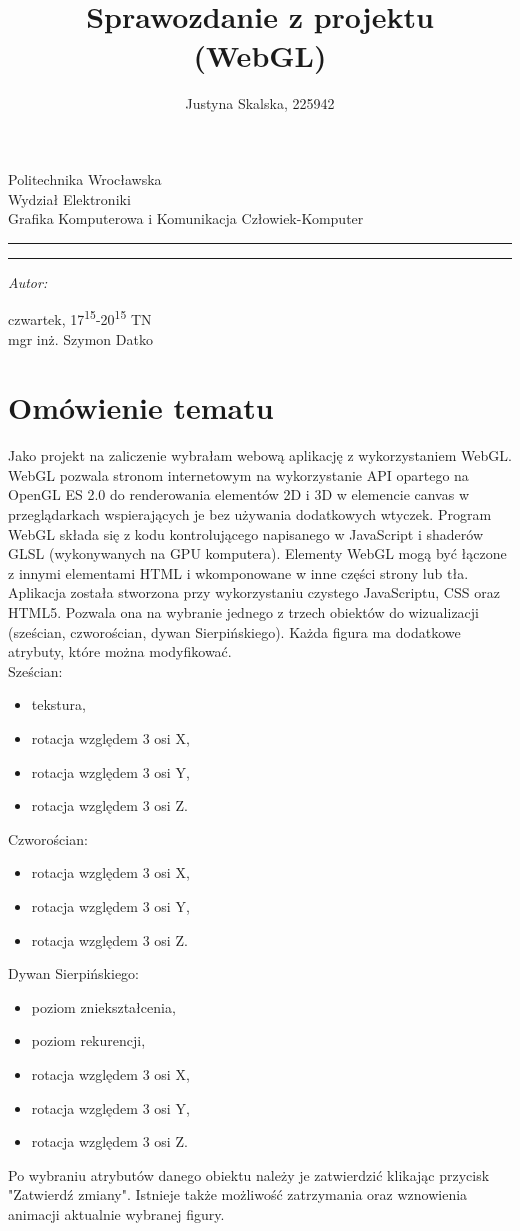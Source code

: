\documentclass[12pt,a4paper,titlepage]{article}
\author{Justyna Skalska, 225942}
\title{Sprawozdanie z projektu\\
(WebGL)}
\makeatletter
\newcommand{\linia}{\rule{\linewidth}{0.4mm}}
\renewcommand{\maketitle}{\begin{titlepage}
    \vspace*{1cm}
    \begin{center}\small
    Politechnika Wrocławska\\
    Wydział Elektroniki\\
    Grafika Komputerowa i Komunikacja Człowiek-Komputer
    \end{center}
    \vspace{3cm}
    \noindent\linia
    \begin{center}
      \LARGE \textsc{\@title}
         \end{center}
     \linia
    \vspace{0.5cm}
    \begin{flushright}
    \begin{minipage}{7cm}
    \textit{\small Autor:}\\
    \normalsize \textsc{\@author} \par
    \end{minipage}
    \vspace{5cm}

     {\small czwartek, 17\textsuperscript{15}-20\textsuperscript{15} TN}\\
        mgr inż. Szymon Datko
     \end{flushright}
    \vspace*{\stretch{6}}
    \begin{center}
    \@date
    \end{center}
  \end{titlepage}%
}
\makeatother
\begin{document}
\maketitle
\tableofcontents
\newpage

\section{Omówienie tematu}
Jako projekt na zaliczenie wybrałam webową aplikację z wykorzystaniem WebGL. WebGL pozwala stronom internetowym na wykorzystanie API opartego na OpenGL ES 2.0 do renderowania elementów 2D i 3D w elemencie canvas w przeglądarkach wspierających je bez używania dodatkowych wtyczek. Program WebGL składa się z kodu kontrolującego napisanego w JavaScript i shaderów GLSL (wykonywanych na GPU komputera). Elementy WebGL mogą być łączone z innymi elementami HTML i wkomponowane w inne części strony lub tła. \cite{mozilla} Aplikacja została stworzona przy wykorzystaniu czystego JavaScriptu, CSS oraz HTML5. Pozwala ona na wybranie jednego z trzech obiektów do wizualizacji (sześcian, czworościan, dywan Sierpińskiego). Każda figura ma dodatkowe atrybuty, które można modyfikować.\\
\newline
Sześcian:
\begin{itemize}
    \item tekstura,
    \item rotacja względem 3 osi X,
    \item rotacja względem 3 osi Y,
    \item rotacja względem 3 osi Z.
\end{itemize}
Czworościan:
\begin{itemize}
    \item rotacja względem 3 osi X,
    \item rotacja względem 3 osi Y,
    \item rotacja względem 3 osi Z.
\end{itemize}
Dywan Sierpińskiego:
\begin{itemize}
    \item poziom zniekształcenia,
    \item poziom rekurencji,
    \item rotacja względem 3 osi X,
    \item rotacja względem 3 osi Y,
    \item rotacja względem 3 osi Z.
\end{itemize}
Po wybraniu atrybutów danego obiektu należy je zatwierdzić klikając przycisk "Zatwierdź zmiany". Istnieje także możliwość zatrzymania oraz wznowienia animacji aktualnie wybranej figury.
\end{document}

